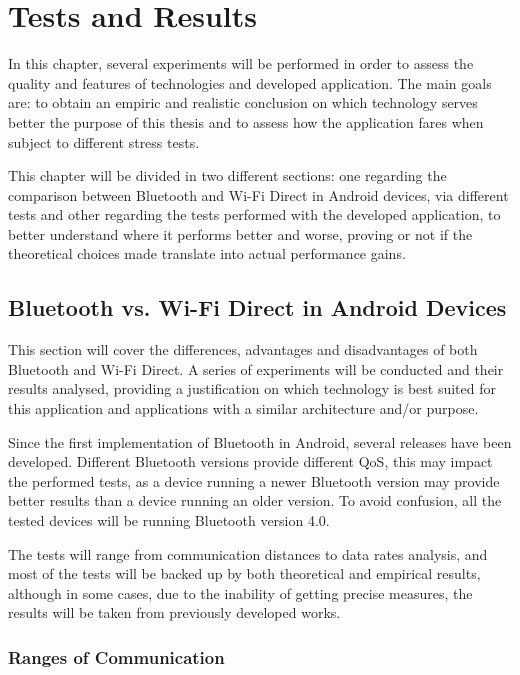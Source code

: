 \chapter{Tests and Results}
\label{tests}

In this chapter, several experiments will be performed in order to assess the quality and features of technologies and developed application. The main goals are: to obtain an empiric and realistic conclusion on which technology serves better the purpose of this thesis and to assess how the application fares when subject to different stress tests.

This chapter will be divided in two different sections: one regarding the comparison between Bluetooth and Wi-Fi Direct in Android devices, via different tests and other regarding the tests performed with the developed application, to better understand where it performs better and worse, proving or not if the theoretical choices made translate into actual performance gains.

\section{Bluetooth vs. Wi-Fi Direct in Android Devices}

This section will cover the differences, advantages and disadvantages of both Bluetooth and Wi-Fi Direct. A series of experiments will be conducted and their results analysed, providing a justification on which technology is best suited for this application and applications with a similar architecture and/or purpose.

Since the first implementation of Bluetooth in Android, several releases have been developed. Different Bluetooth versions provide different \gls{QoS}, this may impact the performed tests, as a device running a newer Bluetooth version may provide better results than a device running an older version. To avoid confusion, all the tested devices will be running Bluetooth version 4.0.

The tests will range from communication distances to data rates analysis, and most of the tests will be backed up by both theoretical and empirical results, although in some cases, due to the inability of getting precise measures, the results will be taken from previously developed works.

\subsection{Ranges of Communication}
\label{subsec:ranges}

